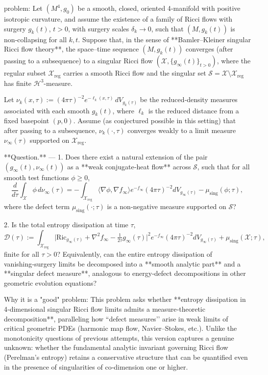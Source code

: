 problem:  
Let \( (M^4, g_0) \) be a smooth, closed, oriented 4‑manifold with positive isotropic curvature, and assume the existence of a family of Ricci flows with surgery \( g_k(t) \), \(t>0\), with surgery scales \( \delta_k \to 0 \), such that \( (M, g_k(t)) \) is non‑collapsing for all \(k,t\).  
Suppose that, in the sense of **Bamler–Kleiner singular Ricci flow theory**, the space–time sequence \( (M,g_k(t)) \) converges (after passing to a subsequence) to a singular Ricci flow \( (\mathcal{X}, \{g_\infty(t)\}_{t>0}) \), where the regular subset \(\mathcal{X}_{\mathrm{reg}}\) carries a smooth Ricci flow and the singular set \(\mathcal{S} = \mathcal{X} \setminus \mathcal{X}_{\mathrm{reg}}\) has finite \(\mathcal{H}^3\)-measure.

Let \(\nu_k(x,\tau) := (4\pi\tau)^{-2} e^{-\ell_k(x,\tau)}\, dV_{g_k(\tau)}\) be the reduced‑density measures associated with each smooth \(g_k(t)\), where \(\ell_k\) is the reduced distance from a fixed basepoint \((p,0)\).  
Assume (as conjectured possible in this setting) that after passing to a subsequence, \(\nu_k(\cdot,\tau)\) converges weakly to a limit measure \(\nu_\infty(\tau)\) supported on \(\mathcal{X}_{\mathrm{reg}}\).  

**Question.** —  
1. Does there exist a natural extension of the pair \( (g_\infty(t), \nu_\infty(t)) \) as a **weak conjugate‑heat flow** across \(\mathcal{S}\), such that for all smooth test functions \(\phi\ge0\),
   \[
   \frac{d}{d\tau} \int_{\mathcal{X}} \phi\, d\nu_\infty(\tau)
   = -\int_{\mathcal{X}_{\mathrm{reg}}} \langle \nabla\phi,\nabla f_\infty\rangle e^{-f_\infty}(4\pi\tau)^{-2} dV_{g_\infty(\tau)} - \mu_{\mathrm{sing}}(\phi;\tau),
   \]
   where the defect term \(\mu_{\mathrm{sing}}(\cdot;\tau)\) is a non‑negative measure supported on \(\mathcal{S}\)?  

2. Is the total entropy dissipation at time \(\tau\),
   \[
   \mathcal{D}(\tau) := \int_{\mathcal{X}_{\mathrm{reg}}} \big| \mathrm{Ric}_{g_\infty(\tau)} + \nabla^2 f_\infty - \tfrac{1}{2\tau} g_\infty(\tau)\big|^2 e^{-f_\infty}(4\pi\tau)^{-2} dV_{g_\infty(\tau)} + \mu_{\mathrm{sing}}(\mathcal{X};\tau),
   \]
   finite for all \(\tau>0\)?  
   Equivalently, can the entire entropy dissipation of vanishing‑surgery limits be decomposed into a **smooth analytic part** and a **singular defect measure**, analogous to energy‑defect decompositions in other geometric evolution equations?

Why it is a "good" problem:  
This problem asks whether **entropy dissipation in 4‑dimensional singular Ricci flow limits admits a measure‑theoretic decomposition**, paralleling how “defect measures’’ arise in weak limits of critical geometric PDEs (harmonic map flow, Navier–Stokes, etc.).  
Unlike the monotonicity questions of previous attempts, this version captures a genuine unknown: whether the fundamental analytic invariant governing Ricci flow (Perelman’s entropy) retains a conservative structure that can be quantified even in the presence of singularities of co‑dimension one or higher.

